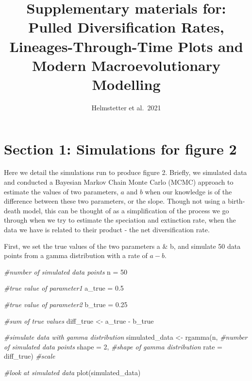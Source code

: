 \documentclass[
]{article}
\title{Supplementary materials for: Pulled Diversification Rates,
Lineages-Through-Time Plots and Modern Macroevolutionary Modelling}
\author{Helmstetter et al.~2021}
\date{}
\newenvironment{Shaded}{\begin{snugshade}}{\end{snugshade}}
\newcommand{\AttributeTok}[1]{\textcolor[rgb]{0.77,0.63,0.00}{#1}}
\newcommand{\CommentTok}[1]{\textcolor[rgb]{0.56,0.35,0.01}{\textit{#1}}}
\newcommand{\DecValTok}[1]{\textcolor[rgb]{0.00,0.00,0.81}{#1}}
\newcommand{\FloatTok}[1]{\textcolor[rgb]{0.00,0.00,0.81}{#1}}
\newcommand{\FunctionTok}[1]{\textcolor[rgb]{0.00,0.00,0.00}{#1}}
\newcommand{\NormalTok}[1]{#1}
\newcommand{\OtherTok}[1]{\textcolor[rgb]{0.56,0.35,0.01}{#1}}
\newcommand{\SpecialCharTok}[1]{\textcolor[rgb]{0.00,0.00,0.00}{#1}}
\begin{document}
\maketitle

{
\hypersetup{linkcolor=}
\setcounter{tocdepth}{2}
\tableofcontents
}
\pagebreak

\hypertarget{section-1-simulations-for-figure-2}{%
\section{Section 1: Simulations for figure
2}\label{section-1-simulations-for-figure-2}}

Here we detail the simulations run to produce figure 2. Briefly, we
simulated data and conducted a Bayesian Markov Chain Monte Carlo (MCMC)
approach to estimate the values of two parameters, \(a\) and \(b\) when
our knowledge is of the difference between these two parameters, or the
slope. Though not using a birth-death model, this can be thought of as a
simplification of the process we go through when we try to estimate the
speciation and extinction rate, when the data we have is related to
their product - the net diversification rate.

First, we set the true values of the two parameters a \& b, and simulate
50 data points from a gamma distribution with a rate of \(a-b\).

\begin{Shaded}
\begin{Highlighting}[]
\CommentTok{\#number of simulated data points}
\NormalTok{n }\OtherTok{=}  \DecValTok{50}

\CommentTok{\#true value of parameter1}
\NormalTok{a\_true }\OtherTok{=} \FloatTok{0.5}

\CommentTok{\#true value of parameter2}
\NormalTok{b\_true }\OtherTok{=} \FloatTok{0.25}

\CommentTok{\#sum of true values}
\NormalTok{diff\_true }\OtherTok{\textless{}{-}}\NormalTok{ a\_true }\SpecialCharTok{{-}}\NormalTok{ b\_true}

\CommentTok{\#simulate data with gamma distribution}
\NormalTok{simulated\_data }\OtherTok{\textless{}{-}} \FunctionTok{rgamma}\NormalTok{(n, }\CommentTok{\#number of simulated data points}
                         \AttributeTok{shape =} \DecValTok{2}\NormalTok{, }\CommentTok{\#shape of gamma distribution}
                         \AttributeTok{rate =}\NormalTok{ diff\_true) }\CommentTok{\#scale}


\CommentTok{\#look at simulated data}
\FunctionTok{plot}\NormalTok{(simulated\_data)}
\end{Highlighting}
\end{Shaded}
\end{document}
